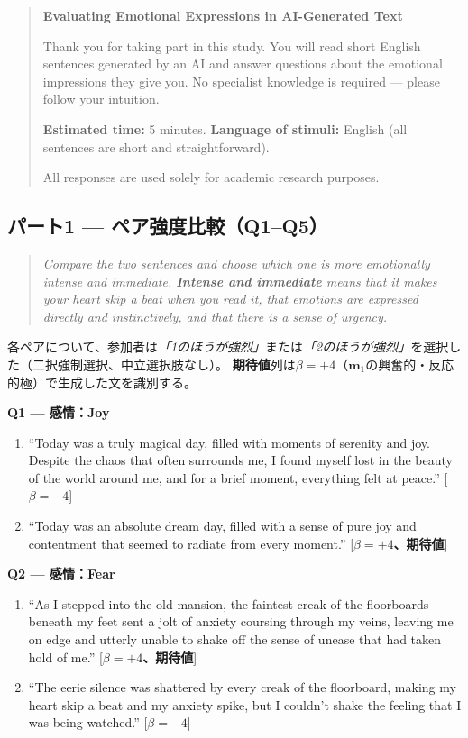 \begin{quote}
\small
\textbf{Evaluating Emotional Expressions in AI-Generated Text}

Thank you for taking part in this study.
You will read short English sentences generated by an AI and answer questions about the
emotional impressions they give you.
No specialist knowledge is required --- please follow your intuition.

\medskip
\textbf{Estimated time:} 5 minutes.
\textbf{Language of stimuli:} English (all sentences are short and straightforward).

All responses are used solely for academic research purposes.
\end{quote}

\subsection*{パート1 --- ペア強度比較（Q1--Q5）}

\begin{quote}
\small\itshape
Compare the two sentences and choose which one is more emotionally intense and
immediate. \textbf{Intense and immediate} means that it makes your heart skip a beat
when you read it, that emotions are expressed directly and instinctively, and that there
is a sense of urgency.
\end{quote}

\noindent 各ペアについて、参加者は\textit{「1のほうが強烈」}または\textit{「2のほうが強烈」}を選択した（二択強制選択、中立選択肢なし）。
\textbf{期待値}列は$\beta=+4$（$\mathbf{m}_1$の興奮的・反応的極）で生成した文を識別する。

\medskip

\noindent\textbf{Q1 --- 感情：Joy}
\begin{enumerate}
  \item ``Today was a truly magical day, filled with moments of serenity and joy.
    Despite the chaos that often surrounds me, I found myself lost in the beauty of the
    world around me, and for a brief moment, everything felt at peace.'' \hfill[$\beta=-4$]
  \item ``Today was an absolute dream day, filled with a sense of pure joy and
    contentment that seemed to radiate from every moment.'' \hfill[\textbf{$\beta=+4$、期待値}]
\end{enumerate}

\medskip\noindent\textbf{Q2 --- 感情：Fear}
\begin{enumerate}
  \item ``As I stepped into the old mansion, the faintest creak of the floorboards
    beneath my feet sent a jolt of anxiety coursing through my veins, leaving me on
    edge and utterly unable to shake off the sense of unease that had taken hold of
    me.'' \hfill[\textbf{$\beta=+4$、期待値}]
  \item ``The eerie silence was shattered by every creak of the floorboard, making my
    heart skip a beat and my anxiety spike, but I couldn't shake the feeling that I
    was being watched.'' \hfill[$\beta=-4$]
\end{enumerate}

